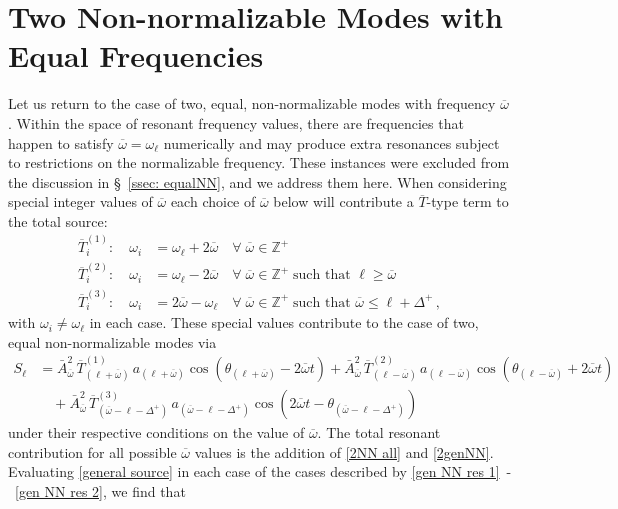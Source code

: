 \documentclass[letterpaper,11pt]{article}
\newcommand{\ol}{\omega_\ell}
\newcommand{\ob}{\overline{\omega}}
\begin{document}
\section{Two Non-normalizable Modes with Equal Frequencies}
\label{more 2NN}
Let us return to the case of two, equal, non-normalizable modes with frequency $\ob$. Within the space of resonant frequency values, there are frequencies that happen to satisfy $\ob = \ol$ numerically and may produce extra resonances subject to restrictions on the normalizable frequency. These instances were excluded from the discussion in \S\!~\ref{ssec: equalNN}, and we address them here. When considering special integer values of $\ob$ each choice of $\ob$ below will contribute a $\overline T$-type term to the total source:
\begin{align}
\label{gen NN res 1}
\overline{T}^{(1)}_{i}: \quad \omega_i &= \ol + 2\ob \quad \forall \; \ob \in \mathbb{Z}^+ \\
\overline{T}^{(2)}_{i}: \quad \omega_i &= \ol - 2\ob \quad \forall \; \ob \in \mathbb{Z}^+ \; \text{such that } \ell \geq \ob \\
\label{gen NN res 2}
\overline{T}^{(3)}_{i}: \quad \omega_i &= 2\ob - \ol \quad \forall \; \ob \in \mathbb{Z}^+ \; \text{such that } \ob \leq \ell + \Delta^+ \, ,
\end{align}
with $\omega_i \neq \omega_\ell$ in each case. These special values contribute to the case of two, equal non-normalizable modes via
\begin{align}
\label{2NN all}
S_\ell &= \bar A^2_{\ob} \, \overline{T}^{(1)}_{(\ell + \ob)} \, a_{(\ell + \ob)} \cos \left( \theta_{(\ell + \ob)} - 2\ob t \right) + \bar A^2_{\ob} \, \overline{T}^{(2)}_{(\ell - \ob)} \, a_{(\ell - \ob)}\cos \left( \theta_{(\ell - \ob)} + 2\ob t \right) \nonumber \\
& \quad + \bar A^2_{\ob} \, \overline{T}^{(3)}_{(\ob - \ell - \Delta^+)} \, a_{(\ob - \ell- \Delta^+)} \cos \left( 2\ob t - \theta_{(\ob - \ell - \Delta^+)} \right) 
\end{align}
under their respective conditions on the value of $\ob$. The total resonant contribution for all possible $\ob$ values is the addition of \eqref{2NN all} and \eqref{2genNN}. 
Evaluating \eqref{general source} in each case of the cases described by \eqref{gen NN res 1}~\!-~\!\eqref{gen NN res 2}, we find that
\end{document}

